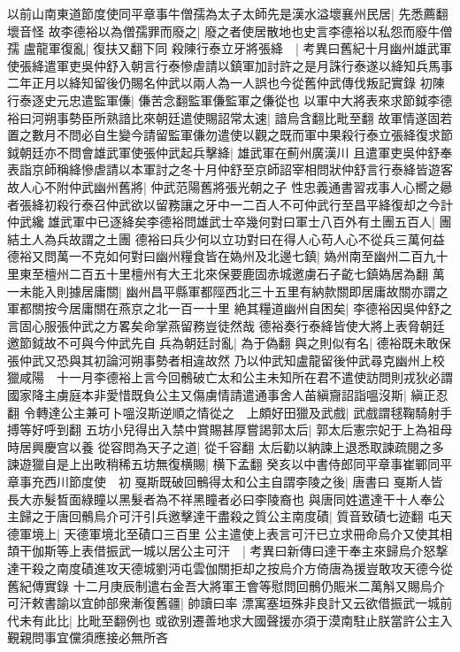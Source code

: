 以前山南東道節度使同平章事牛僧孺為太子太師先是漢水溢壞襄州民居|{
	先悉薦翻壞音怪}
故李德裕以為僧孺罪而廢之|{
	廢之者使居散地也史言李德裕以私怨而廢牛僧孺}
盧龍軍復亂|{
	復扶又翻下同}
殺陳行泰立牙將張絳　|{
	考異曰舊紀十月幽州雄武軍使張絳遣軍吏吳仲舒入朝言行泰慘虐請以鎮軍加討許之是月誅行泰遂以絳知兵馬事二年正月以絳知留後仍賜名仲武以兩人為一人誤也今從舊仲武傳伐叛記實錄}
初陳行泰逐史元忠遣監軍傔|{
	傔苦念翻監軍傔監軍之傔從也}
以軍中大將表來求節鉞李德裕曰河朔事勢臣所熟諳比來朝廷遣使賜詔常太速|{
	諳烏含翻比毗至翻}
故軍情遂固若置之數月不問必自生變今請留監軍傔勿遣使以觀之既而軍中果殺行泰立張絳復求節鉞朝廷亦不問會雄武軍使張仲武起兵擊絳|{
	雄武軍在薊州廣漢川}
且遣軍吏吳仲舒奉表詣京師稱絳慘虐請以本軍討之冬十月仲舒至京師詔宰相問狀仲舒言行泰絳皆遊客故人心不附仲武幽州舊將|{
	仲武范陽舊將張光朝之子}
性忠義通書習戎事人心嚮之曏者張絳初殺行泰召仲武欲以留務讓之牙中一二百人不可仲武行至昌平絳復却之今計仲武纔雄武軍中已逐絳矣李德裕問雄武士卒幾何對曰軍士八百外有土團五百人|{
	團結土人為兵故謂之土團}
德裕曰兵少何以立功對曰在得人心苟人心不從兵三萬何益德裕又問萬一不克如何對曰幽州糧食皆在媯州及北邊七鎮|{
	媯州南至幽州二百九十里東至檀州二百五十里檀州有大王北來保要鹿固赤城邀虜石子齕七鎮媯居為翻}
萬一未能入則據居庸關|{
	幽州昌平縣軍都陘西北三十五里有納款關即居庸故關亦謂之軍都關按今居庸關在燕京之北一百一十里}
絶其糧道幽州自困矣|{
	李德裕因吳仲舒之言固心服張仲武之方畧矣命掌燕留務豈徒然哉}
德裕奏行泰絳皆使大將上表脅朝廷邀節鉞故不可與今仲武先自兵為朝廷討亂|{
	為于偽翻}
與之則似有名|{
	德裕既未敢保張仲武又恐與其初論河朔事勢者相違故然}
乃以仲武知盧龍留後仲武尋克幽州上校獵咸陽　十一月李德裕上言今回鶻破亡太和公主未知所在君不遣使訪問則戎狄必謂國家降主虜庭本非愛惜既負公主又傷虜情請遣通事舍人苖縝齎詔詣嗢沒斯|{
	縝正忍翻}
令轉達公主兼可卜嗢沒斯逆順之情從之　上頗好田獵及武戲|{
	武戲謂毬鞠騎射手搏等好呼到翻}
五坊小兒得出入禁中賞賜甚厚嘗謁郭太后|{
	郭太后憲宗妃于上為祖母時居興慶宫以養}
從容問為天子之道|{
	從千容翻}
太后勸以納諫上退悉取諫疏閱之多諫遊獵自是上出畋稍稀五坊無復横賜|{
	横下孟翻}
癸亥以中書侍郎同平章事崔鄲同平章事充西川節度使　初戛斯既破回鶻得太和公主自謂李陵之後|{
	唐書曰戛斯人皆長大赤髮晳面綠瞳以黑髮者為不祥黑瞳者必曰李陵裔也}
與唐同姓遣達干十人奉公主歸之于唐回鶻烏介可汗引兵邀擊達干盡殺之質公主南度磧|{
	質音致磧七迹翻}
屯天德軍境上|{
	天德軍境北至磧口三百里}
公主遣使上表言可汗已立求冊命烏介又使其相頡干伽斯等上表借振武一城以居公主可汗　|{
	考異曰新傳曰達干奉主來歸烏介怒撃達干殺之南度磧進攻天德城劉沔屯雲伽關拒却之按烏介方倚唐為援豈敢攻天德今從舊紀傳實錄}
十二月庚辰制遣右金吾大將軍王會等慰問回鶻仍賑米二萬斛又賜烏介可汗敕書諭以宜帥部衆漸復舊疆|{
	帥讀曰率}
漂寓塞垣殊非良計又云欲借振武一城前代未有此比|{
	比毗至翻例也}
或欲别遷善地求大國聲援亦須于漠南駐止朕當許公主入覲親問事宜儻須應接必無所吝

